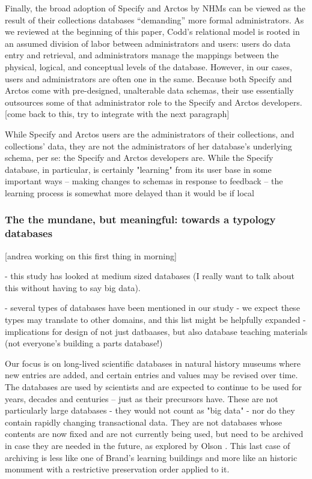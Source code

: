 Finally, the broad adoption of Specify and Arctos by NHMs can be viewed as the result of their collections databases “demanding” more formal administrators. As we reviewed at the beginning of this paper, Codd’s relational model is rooted in an assumed division of labor between administrators and users: users do data entry and retrieval, and administrators manage the mappings between the physical, logical, and conceptual levels of the database. However, in our cases, users and administrators are often one in the same. Because both Specify and Arctos come with pre-designed, unalterable data schemas, their use essentially outsources some of that administrator role to the Specify and Arctos developers.  [come back to this, try to integrate with the next paragraph]

While Specify and Arctos users are the administrators of their collections, and collections’ data, they are not the administrators of her database's underlying schema, per se: the Specify and Arctos developers are.  While the Specify database, in particular, is certainly "learning" from its user base in some important ways – making changes to schemas in response to feedback – the learning process is somewhat more delayed than it would be if local 


\subsubsection{The the mundane, but meaningful: towards a typology databases}

[andrea working on this first thing in morning]

- this study has looked at medium sized databases (I really want to talk about this without having to say big data).

- several types of databases have been mentioned in our study
- we expect these types may translate to other domains, and this list might be helpfully expanded
- implications for design of not just datbaases, but also database teaching materials (not everyone's building a parts database!)

Our focus is on long-lived scientific databases in natural history museums where new entries are added, and certain entries and values may be revised over time. The databases are used by scientists and are expected to continue to be used for years, decades and centuries – just as their precursors have. These are not particularly large databases - they would not count as "big data" - nor do they contain rapidly changing transactional data. They are not databases whose contents are now fixed and are not currently being used, but need to be archived in case they are  needed in the future, as explored by Olson \cite{olson2010database}. This last case of archiving is less like one of Brand’s learning buildings and more like an historic monument with a restrictive preservation order applied to it.

